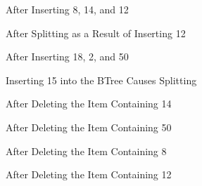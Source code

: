 \documentclass[letterpaper,10pt,english]{sphinxmanual}
\begin{document}
\begin{figure}[htbp]
\centering
\capstart

\noindent{}
\caption{After Inserting 8, 14, and 12}\label{\detokenize{chap10/chap10:id8}}\end{figure}

\begin{figure}[htbp]
\centering
\capstart

\noindent{}
\caption{After Splitting as a Result of Inserting 12}\label{\detokenize{chap10/chap10:id9}}\end{figure}

\begin{figure}[htbp]
\centering
\capstart

\noindent{}
\caption{After Inserting 18, 2, and 50}\label{\detokenize{chap10/chap10:id10}}\end{figure}

\begin{figure}[htbp]
\centering
\capstart

\noindent{}
\caption{Inserting 15 into the B\sphinxhyphen{}Tree Causes Splitting}\label{\detokenize{chap10/chap10:id11}}\end{figure}

\begin{figure}[htbp]
\centering
\capstart

\noindent{}
\caption{After Deleting the Item Containing 14}\label{\detokenize{chap10/chap10:id12}}\end{figure}

\begin{figure}[htbp]
\centering
\capstart

\noindent{}
\caption{After Deleting the Item Containing 50}\label{\detokenize{chap10/chap10:id13}}\end{figure}

\begin{figure}[htbp]
\centering
\capstart

\noindent{}
\caption{After Deleting the Item Containing 8}\label{\detokenize{chap10/chap10:id14}}\end{figure}

\begin{figure}[htbp]
\centering
\capstart

\noindent{}
\caption{After Deleting the Item Containing 12}\label{\detokenize{chap10/chap10:id15}}\end{figure}
\end{document}
